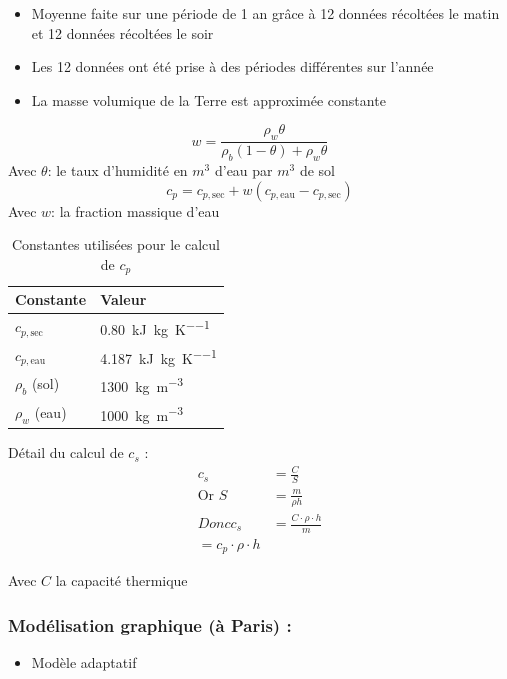 \documentclass[a4paper,12pt]{article}
\begin{document}
\begin{itemize}
    \item Moyenne faite sur une période de 1 an grâce à 12 données récoltées le matin et 12 données récoltées le soir 
    \item Les 12 données ont été prise à des périodes différentes sur l'année 
    \item La masse volumique de la Terre est approximée constante 
\end{itemize}
\[
w = \frac{\rho_w \theta}{\rho_b (1 - \theta) + \rho_w \theta}
\]
Avec \(\theta\): le taux d'humidité en \(m^3\) d'eau par \(m^3\) de sol 
\[
c_p = c_{p,\text{sec}} + w (c_{p,\text{eau}} - c_{p,\text{sec}})
\]
Avec \(w\): la fraction massique d'eau 
\begin{table}[h!]
\centering
\begin{tabular}{ll}
\textbf{Constante} & \textbf{Valeur} \\
\hline
$c_{p,\text{sec}}$ & \SI{0.80}{\kilo\joule\per\kilogram\per\kelvin} \\
$c_{p,\text{eau}}$ & \SI{4.187}{\kilo\joule\per\kilogram\per\kelvin} \\
$\rho_b$ (sol) & \SI{1300}{\kilogram\per\cubic\metre} \\
$\rho_w$ (eau) & \SI{1000}{\kilogram\per\cubic\metre} \\
\end{tabular}
\caption*{Constantes utilisées pour le calcul de $c_p$}
\vspace{1cm}
\end{table}

Détail du calcul de \( c_s \) :\\
\begin{align*}
c_s &= \frac{C}{S} \\
\text{Or } S &= \frac{m}{\rho h} \\
Donc c_s &= \frac{C \cdot \rho \cdot h}{m} \\
        = c_p \cdot \rho \cdot h
\end{align*}

\hspace*{2cm}Avec \( C \) la capacité thermique



\subsubsection*{Modélisation graphique (à Paris) :} 
\begin{itemize}
    \item Modèle adaptatif
\end{itemize}
\end{document}

